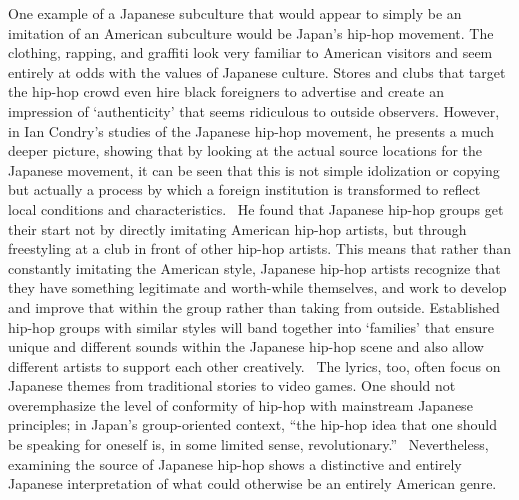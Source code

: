 \documentclass[12pt]{article}
\begin{document}
One example of a Japanese subculture that would appear to simply be an imitation of an American subculture would be Japan's hip-hop movement.  The clothing, rapping, and graffiti look very familiar to American visitors and seem entirely at odds with the values of Japanese culture.  Stores and clubs that target the hip-hop crowd even hire black foreigners to advertise and create an impression of `authenticity' that seems ridiculous to outside observers.  However, in Ian Condry's studies of the Japanese hip-hop movement, he presents a much deeper picture, showing that by looking at the actual source locations for the Japanese movement, it can be seen that this is not simple idolization or copying but actually a process by which a foreign institution is transformed to reflect local conditions and characteristics.~\cHopGlob{\citep[pg.\ 381]}  He found that Japanese hip-hop groups get their start not by directly imitating American hip-hop artists, but through freestyling at a club in front of other hip-hop artists.%
This means that rather than constantly imitating the American style, Japanese hip-hop artists recognize that they have something legitimate and worth-while themselves, and work to develop and improve that within the group rather than taking from outside.  Established hip-hop groups with similar styles will band together into `families' that ensure unique and different sounds within the Japanese hip-hop scene and also allow different artists to support each other creatively.~\cHopGlob{\citep[pg.\ 379]}  The lyrics, too, often focus on Japanese themes from traditional stories to video games.  
One should not overemphasize the level of conformity of hip-hop with mainstream Japanese principles; in Japan's group-oriented context, ``the hip-hop idea that one should be speaking for oneself is, in some limited sense, revolutionary.''~\cHopGlob{\citep[pg.\ 384]}
Nevertheless, examining the source of Japanese hip-hop shows a distinctive and entirely Japanese interpretation of what could otherwise be an entirely American genre.

\end{document}
